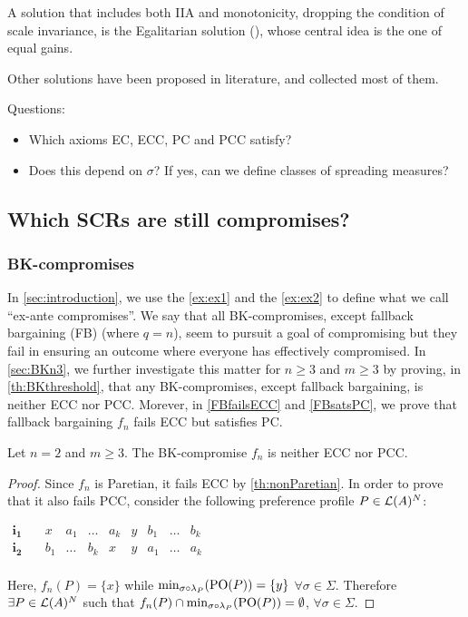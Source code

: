 \documentclass[version=3.21, pagesize, twoside=off, bibliography=totoc, DIV=calc, fontsize=12pt, a4paper]{scrartcl}
\begin{document}
A solution that includes both IIA and monotonicity, dropping the condition of scale invariance, is the Egalitarian solution (\cite{Kalai1977}), whose central idea is the one of equal gains.

Other solutions have been proposed in literature, and \cite{Thomson1994} collected most of them.

Questions:
\begin{itemize}
	\item Which axioms EC, ECC, PC and PCC satisfy?
	\item Does this depend on $\sigma$? If yes, can we define classes of spreading measures?
\end{itemize}

\subsection{Which SCRs are still compromises?}

\subsubsection{BK-compromises}
In \cref{sec:introduction}, we use the \cref{ex:ex1} and the \cref{ex:ex2} to define what we call “ex-ante compromises”. We say that all BK-compromises, except fallback bargaining (FB) (where $q=n$), seem to pursuit a goal of compromising but they fail in ensuring an outcome where everyone has effectively compromised. In \cref{sec:BKn3}, we further investigate this matter for $n\geq3$ and $m\geq3$ by proving, in \cref{th:BKthreshold}, that any BK-compromises, except fallback bargaining, is neither ECC nor PCC. Morever, in \cref{FBfailsECC} and \cref{FBsatsPC}, we prove that fallback bargaining $f_{n}$ fails ECC but satisfies PC.

\begin{Theorem}
	Let $n=2$ and $m\geq3$. The BK-compromise $f_{n}$ is neither ECC nor PCC. 
\end{Theorem}

\begin{proof}
	Since $f_{n}$ is Paretian, it fails ECC by \cref{th:nonParetian}. In order to prove that it also fails PCC, consider the following preference profile $P\in \mathcal{L}(A)^{N}$:
\begin{center}
	$
	\begin{array}{cccccccccc}
	\mathbf{i_1} \quad &x&a_1&\dots&a_k&y&b_1&\dots&b_k\\
	\mathbf{i_2} \quad &b_1&\dots&b_{k}&x&y&a_1&\dots&a_k\\
	\end{array}
	$
\end{center}
Here, $f_n(P)=\{x\}$ while $\mustar=\{y\}$ $\forall \sigma \in \Sigma$. Therefore $\exists P \in  \mathcal{L}(A)^{N}$ such that $f_n(P) \cap \mustar = \emptyset$, $\forall \sigma \in \Sigma$.
\end{proof}
\end{document}
